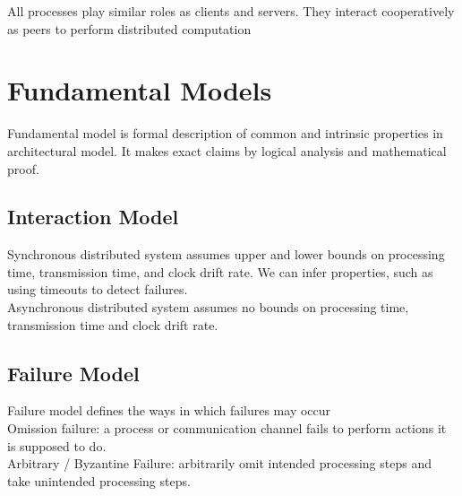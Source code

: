 \begin{multicols*}{2}
\noindent All processes play similar roles as clients and servers. They interact cooperatively as peers to perform distributed computation 

\section{Fundamental Models}

\noindent Fundamental model is formal description of common and intrinsic properties in architectural model. It makes exact claims by logical analysis and mathematical proof. 

\subsection{Interaction Model}

\noindent Synchronous distributed system assumes upper and lower bounds on processing time, transmission time, and clock drift rate. We can infer properties, such as using timeouts to detect failures.\\

\noindent Asynchronous distributed system assumes no bounds on processing time, transmission time and clock drift rate.

\subsection{Failure Model}

\noindent Failure model defines the ways in which failures may occur \\

\noindent Omission failure: a process or communication channel fails to perform actions it is supposed to do. \\

\noindent Arbitrary / Byzantine Failure: arbitrarily omit intended processing steps and take unintended processing steps.

\end{multicols*}
